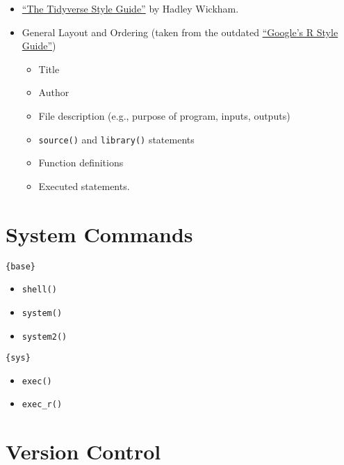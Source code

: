 \documentclass[
]{book}
\providecommand{\tightlist}{%
  \setlength{\itemsep}{0pt}\setlength{\parskip}{0pt}}
\begin{document}
\begin{itemize}
\tightlist
\item
  \href{https://style.tidyverse.org/}{``The Tidyverse Style Guide''} by Hadley Wickham.
\item
  General Layout and Ordering (taken from the outdated \href{http://web.stanford.edu/class/cs109l/unrestricted/resources/google-style.html}{``Google's R Style Guide''})

  \begin{itemize}
  \tightlist
  \item
    Title
  \item
    Author
  \item
    File description (e.g., purpose of program, inputs, outputs)
  \item
    \texttt{source()} and \texttt{library()} statements
  \item
    Function definitions
  \item
    Executed statements.
  \end{itemize}
\end{itemize}

\hypertarget{system-commands}{%
\section{System Commands}\label{system-commands}}

\texttt{\{base\}}

\begin{itemize}
\tightlist
\item
  \texttt{shell()}
\item
  \texttt{system()}
\item
  \texttt{system2()}
\end{itemize}

\texttt{\{sys\}}

\begin{itemize}
\tightlist
\item
  \texttt{exec()}
\item
  \texttt{exec\_r()}
\end{itemize}

\hypertarget{version-control}{%
\section{Version Control}\label{version-control}}
\end{document}
